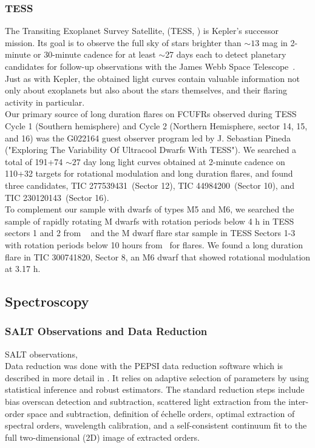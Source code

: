 \documentclass[fleqn,usenatbib,letters]{mnras}%
\newcommand{\FA}{TIC 277539431} %
\newcommand{\FB}{TIC 44984200} %
\newcommand{\FF}{TIC 300741820} %
\newcommand{\FG}{TIC 230120143} %
\begin{document}
\subsubsection{TESS}
\label{sec:photometryTESS}
The Transiting Exoplanet Survey
Satellite, (TESS, \citealt{ricker2015}) is Kepler's successor mission. Its goal is to observe the full sky of stars brighter than $\sim13$ mag in 2-minute or 30-minute cadence for at least $\sim$27 days each to detect planetary candidates for follow-up observations with the James Webb Space Telescope~\citep{gardner2006}. Just as with Kepler, the obtained light curves contain valuable information not only about exoplanets but also about the stars themselves, and their flaring activity in particular.
\\
Our primary source of long duration flares on FCUFRs observed during TESS Cycle 1 (Southern hemisphere) and Cycle 2 (Northern Hemisphere, sector 14, 15, and 16) was the G022164 guest observer program led by J. Sebastian Pineda ("Exploring The Variability Of Ultracool Dwarfs With TESS"). We searched a total of 191+74 $\sim 27$ day long light curves obtained at 2-minute cadence on 110+32 targets for rotational modulation and long duration flares, and found three candidates, \FA~(Sector 12), \FB~(Sector 10), and \FG~(Sector 16).
\\
To complement our sample with dwarfs of types M5 and M6, we searched the sample of rapidly rotating M dwarfs with rotation periods below 4 h in TESS sectors 1 and 2 from ~\citet{zhan2019} and the M dwarf flare star sample in TESS Sectors 1-3 with rotation periods below 10 hours from~\citet{doyle2019} for flares. We found a long duration flare in \FF, Sector 8, an M6 dwarf that showed rotational modulation at 3.17 h.
\subsection{Spectroscopy}
\label{sec:salt}
\subsubsection{SALT Observations and Data Reduction}
SALT observations,
\\
Data reduction was done with the PEPSI data reduction software which is described in more detail in
\citet{2018Strassmeier}.
It relies on adaptive selection of parameters by using statistical inference
and robust estimators. The standard reduction steps include bias overscan
detection and subtraction, scattered light extraction from the inter-order
space and subtraction, definition of \'echelle orders, optimal extraction of
spectral orders, wavelength calibration, and a self-consistent continuum fit
to the full two-dimensional (2D) image of extracted orders.
\end{document}
